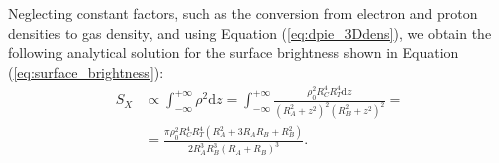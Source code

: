 \documentclass[twocolumn]{aastex61}
\begin{document}
Neglecting constant factors, such as the conversion from electron and proton
densities to gas density, and using Equation (\ref{eq:dpie_3Ddens}), we obtain the
following analytical solution for the surface brightness shown in Equation
(\ref{eq:surface_brightness}):
\begin{equation}
\begin{split}
S_X & \propto \int_{-\infty}^{+\infty}\!\!\! \rho^2 \text{d}z
= \int_{-\infty}^{+\infty}\!\!\! \frac{ \rho_{0}^2 R_{C}^4 R_{T}^4  \text{d}z }{
         \left( R_{A}^2 + z^2 \right)^2
         \left( R_{B}^2 + z^2 \right)^2
    } = \\
& = \frac{ \pi \rho_{0}^2 R_{C}^4 R_{T}^4 \left(  R_{A}^2 + 3 R_{A} R_{B} + R_{B}^2 \right)}
{ 2 R_{A}^3 R_{B}^3  \left(R_{A} + R_{B}\right)^3 }.
\end{split}
\label{eq:I_i}
\end{equation}
\end{document}
